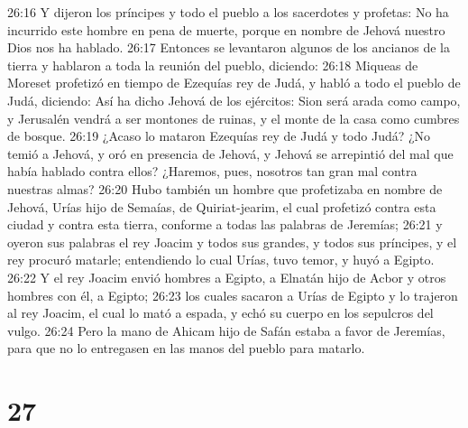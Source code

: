 26:16 Y dijeron los príncipes y todo el pueblo a los sacerdotes y profetas: No ha incurrido este hombre en pena de muerte, porque en nombre de Jehová nuestro Dios nos ha hablado.  
26:17 Entonces se levantaron algunos de los ancianos de la tierra y hablaron a toda la reunión del pueblo, diciendo:  
26:18 Miqueas de Moreset profetizó en tiempo de Ezequías rey de Judá, y habló a todo el pueblo de Judá, diciendo: Así ha dicho Jehová de los ejércitos: Sion será arada como campo, y Jerusalén vendrá a ser montones de ruinas, y el monte de la casa como cumbres de bosque. 
26:19 ¿Acaso lo mataron Ezequías rey de Judá y todo Judá? ¿No temió a Jehová, y oró en presencia de Jehová, y Jehová se arrepintió del mal que había hablado contra ellos? ¿Haremos, pues, nosotros tan gran mal contra nuestras almas?  
26:20 Hubo también un hombre que profetizaba en nombre de Jehová, Urías hijo de Semaías, de Quiriat-jearim, el cual profetizó contra esta ciudad y contra esta tierra, conforme a todas las palabras de Jeremías;  
26:21 y oyeron sus palabras el rey Joacim y todos sus grandes, y todos sus príncipes, y el rey procuró matarle; entendiendo lo cual Urías, tuvo temor, y huyó a Egipto.  
26:22 Y el rey Joacim envió hombres a Egipto, a Elnatán hijo de Acbor y otros hombres con él, a Egipto;  
26:23 los cuales sacaron a Urías de Egipto y lo trajeron al rey Joacim, el cual lo mató a espada, y echó su cuerpo en los sepulcros del vulgo.  
26:24 Pero la mano de Ahicam hijo de Safán estaba a favor de Jeremías, para que no lo entregasen en las manos del pueblo para matarlo. 
  

\chapter{27}

